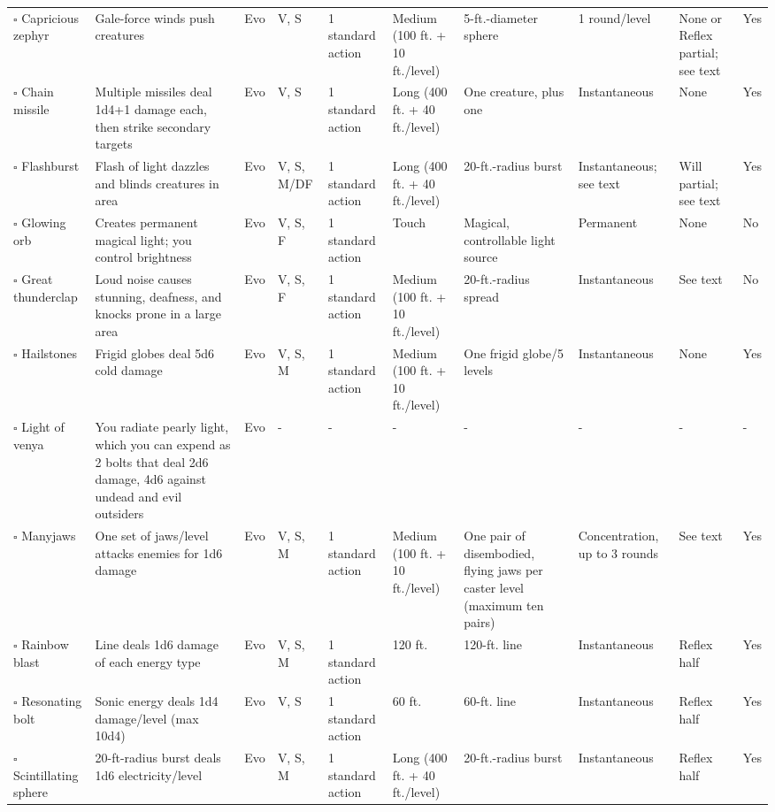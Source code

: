 \documentclass[12pt, a4paper]{article}
\begin{document}
\begin{center}
\begin{longtable}[H]{ p{8em} p{15em} p{2em} p{5em} p{6em} p{6em} p{10em} p{6em} p{5em} p{2em} }
    \(\square\) Capricious zephyr & Gale-force winds push creatures & Evo & V, S & 1 standard action & Medium (100 ft. + 10 ft./level) & 5-ft.-diameter sphere & 1 round/level & None or Reﬂex partial; see text & Yes\\
    \(\square\) Chain missile & Multiple missiles deal 1d4+1 damage each, then strike secondary targets & Evo & V, S & 1 standard action & Long (400 ft. + 40 ft./level) & One creature, plus one  & Instantaneous & None & Yes\\
    \(\square\) Flashburst & Flash of light dazzles and blinds creatures in area & Evo & V, S, M/DF & 1 standard action & Long (400 ft. + 40 ft./level) & 20-ft.-radius burst & Instantaneous; see text & Will partial; see text & Yes\\
    \(\square\) Glowing orb & Creates permanent magical light; you control brightness & Evo & V, S, F & 1 standard action & Touch & Magical, controllable light source & Permanent & None & No\\
    \(\square\) Great thunderclap & Loud noise causes stunning, deafness, and knocks prone in a large area & Evo & V, S, F & 1 standard action & Medium (100 ft. + 10 ft./level) & 20-ft.-radius spread & Instantaneous & See text & No\\
    \(\square\) Hailstones & Frigid globes deal 5d6 cold damage & Evo & V, S, M & 1 standard action & Medium (100 ft. + 10 ft./level) & One frigid globe/5 levels & Instantaneous & None & Yes\\
    \(\square\) Light of venya & You radiate pearly light, which you can expend as 2 bolts that deal 2d6 damage, 4d6 against undead and evil outsiders & Evo & - & - & - & - & - & - & -\\
    \(\square\) Manyjaws & One set of jaws/level attacks enemies for 1d6 damage & Evo & V, S, M & 1 standard action & Medium (100 ft. + 10 ft./level) & One pair of disembodied, ﬂying jaws per caster level (maximum ten pairs) & Concentration, up to 3 rounds & See text & Yes\\
    \(\square\) Rainbow blast & Line deals 1d6 damage of each energy type & Evo & V, S, M & 1 standard action & 120 ft. & 120-ft. line & Instantaneous & Reﬂex half & Yes\\
    \(\square\) Resonating bolt & Sonic energy deals 1d4 damage/level (max 10d4) & Evo & V, S & 1 standard action & 60 ft. & 60-ft. line & Instantaneous & Reﬂex half & Yes\\
    \(\square\) Scintillating sphere & 20-ft-radius burst deals 1d6 electricity/level & Evo & V, S, M & 1 standard action & Long (400 ft. + 40 ft./level) & 20-ft.-radius burst & Instantaneous & Reﬂex half & Yes\\

\end{longtable}
\end{center}
\end{document}
